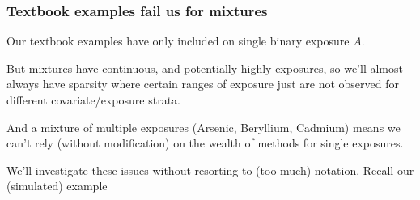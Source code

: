 \title{}
\subtitle{Extending foundational concepts with our coal-fired power plant example}
\author{
	\begin{itemize}
		\item Why textbook examples fail mixtures
		\item Inverse probability weighting and G-computation
		\item Wrap-up
	\end{itemize}
}
\date{}
\begin{frame}
	\titlepage
\end{frame}


\begin{frame}[t]
  \frametitle{Textbook examples fail us for mixtures}
Our textbook examples have only included on single binary exposure $A$. 

\bigskip
But mixtures have continuous, and potentially highly exposures, so we'll almost always have sparsity where certain ranges of exposure just are not observed for different covariate/exposure strata.

\bigskip
And a mixture of multiple exposures (Arsenic, Beryllium, Cadmium) means we can't rely (without modification) on the wealth of methods for single exposures. 


\end{frame}



\begin{frame}[t]
We'll investigate these issues without resorting to (too much) notation. Recall our (simulated) example 

\end{frame}

